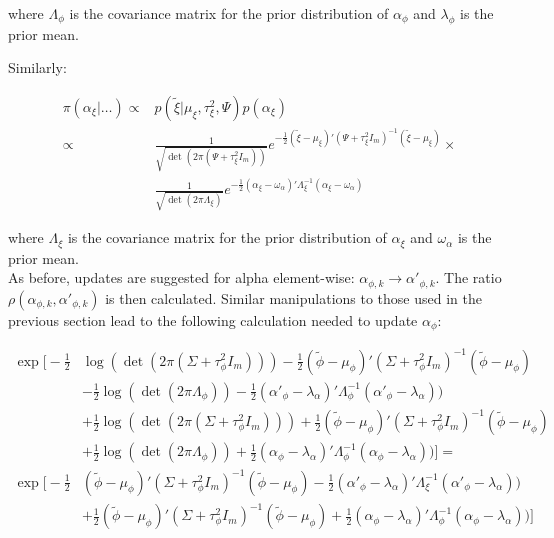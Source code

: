 \documentclass{article}
\begin{document}
where $\Lambda_\phi$ is the covariance matrix for the prior distribution of $\alpha_\phi$ and $\lambda_\phi$ is the prior mean.

Similarly:

\begin{align*}
\pi(\alpha_\xi | \dots ) \propto & p(\tilde{\xi} | \mu_\xi, \tau^2_\xi, \Psi) p(\alpha_\xi) \\
\propto & \frac{1}{\sqrt{\det(2 \pi (\Psi + \tau^2_\xi I_m))}} e^{-\frac{1}{2} (\tilde{\xi} - \mu_\xi)' (\Psi + \tau^2_\xi I_m)^{-1} (\tilde{\xi} - \mu_\xi) } \times \\
& \frac{1}{\sqrt{\det(2 \pi \Lambda_\xi)}} e^{-\frac{1}{2} (\alpha_\xi - \omega_\alpha)' \Lambda_\xi^{-1} (\alpha_\xi - \omega_\alpha) }
\end{align*}

where $\Lambda_\xi$ is the covariance matrix for the prior distribution of $\alpha_\xi$ and $\omega_\alpha$ is the prior mean. \\

As before, updates are suggested for alpha element-wise: $\alpha_{\phi,k} \to \alpha'_{\phi,k}$. The ratio $\rho(\alpha_{\phi,k}, \alpha'_{\phi,k})$ is then calculated. Similar manipulations to those used in the previous section lead to the following calculation needed to update $\alpha_\phi$:

\begin{align}
\exp \Big[ - \frac{1}{2} & \log(\det(2 \pi (\Sigma + \tau^2_\phi I_m))) -\frac{1}{2} (\tilde{\phi} - \mu_\phi)' (\Sigma + \tau^2_\phi I_m)^{-1} (\tilde{\phi} - \mu_\phi) \nonumber \\
& - \frac{1}{2} \log(\det(2 \pi \Lambda_\phi)) -\frac{1}{2} (\alpha'_\phi - \lambda_\alpha)' \Lambda_\phi^{-1} (\alpha'_\phi - \lambda_\alpha) ) \nonumber \\
& + \frac{1}{2} \log(\det(2 \pi (\Sigma + \tau^2_\phi I_m))) + \frac{1}{2} (\tilde{\phi} - \mu_\phi)' (\Sigma + \tau^2_\phi I_m)^{-1} (\tilde{\phi} - \mu_\phi) \nonumber \\
& + \frac{1}{2} \log(\det(2 \pi \Lambda_\phi)) + \frac{1}{2} (\alpha_\phi - \lambda_\alpha)' \Lambda_\phi^{-1} (\alpha_\phi - \lambda_\alpha) )
\Big] = \nonumber \\
\exp \Big[ -\frac{1}{2} & (\tilde{\phi} - \mu_\phi)' (\Sigma + \tau^2_\phi I_m)^{-1} (\tilde{\phi} - \mu_\phi) -\frac{1}{2} (\alpha'_\phi - \lambda_\alpha)' \Lambda_\xi^{-1} (\alpha'_\phi - \lambda_\alpha) ) \nonumber \\
& + \frac{1}{2} (\tilde{\phi} - \mu_\phi)' (\Sigma + \tau^2_\phi I_m)^{-1} (\tilde{\phi} - \mu_\phi) + \frac{1}{2} (\alpha_\phi - \lambda_\alpha)' \Lambda_\phi^{-1} (\alpha_\phi - \lambda_\alpha) )
\Big] \label{eq:2a1}
\end{align}
\end{document}
